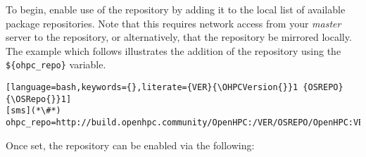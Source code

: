 To begin, enable use of the \OHPC{} repository by adding it to the local list
of available package repositories.  Note that this requires network access from
your {\em master} server to the \OHPC{} repository, or alternatively, that
the \OHPC{} repository be mirrored locally. The example which follows
illustrates the addition of the \OHPC{} repository using
the \texttt{\$\{ohpc\_repo\}} variable.

\begin{lstlisting}[language=bash,keywords={},literate={VER}{\OHPCVersion{}}1 {OSREPO}{\OSRepo{}}1]
[sms](*\#*) ohpc_repo=http://build.openhpc.community/OpenHPC:/VER/OSREPO/OpenHPC:VER.repo
\end{lstlisting}

Once set, the repository can be enabled via the following: 







